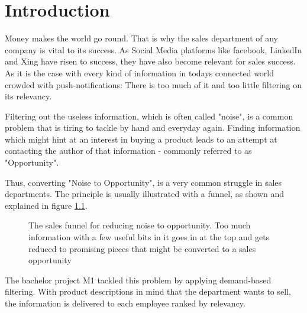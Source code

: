 \chapter{Introduction}\label{ch:introduction}
Money makes the world go round. That is why the sales department
of any company is vital to its success. As Social Media platforms
like facebook, LinkedIn and Xing have risen to success,
they have also become relevant for sales success. As it is the case
with every kind of information in todays connected world crowded
with push-notifications: There is too much of it and too little
filtering on its relevancy.
\newline

Filtering out the useless information, which is often called "noise",
is a common problem that is tiring to tackle by hand and everyday
again. Finding information which might hint at an interest in buying a product
leads to an attempt at contacting the author of that information - commonly
referred to as "Opportunity".
\newline

Thus, converting "Noise to Opportunity", is a very common struggle
in sales departments. The principle is usually illustrated with a funnel,
as shown and explained in figure \ref{fig:sales-funnel}.


\begin{figure}[bth]
    \caption{The sales funnel for reducing noise to opportunity. Too much
    information with a few useful bits in it goes in at the top and gets
    reduced to promising pieces that might be converted to a sales opportunity}
    \label{fig:sales-funnel}
\end{figure}

The bachelor project M1 tackled this problem by applying demand-based filtering.
With product descriptions in mind that the department wants to sell,
the information is delivered to each employee ranked by relevancy.
\newline


